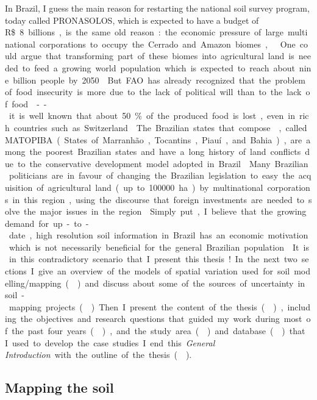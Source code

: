 In Brazil, I guess the main reason for restarting the national soil survey program, today called 
PRONASOLOS, which is expected to have a budget of \SI{8}[R\$]~billions, is the same old reason: the
economic pressure of large multinational corporations to occupy the Cerrado and Amazon biomes, 
 \cite{Macarini2005,Silva2005}. One could argue that transforming part of
these biomes into agricultural land is needed to feed a growing world population which is expected 
to reach about nine billion people by \num{2050} \cite{SanchezEtAl2009}. But FAO has already recognized 
that the problem of food insecurity is more due to the lack of political will than to the
lack of food \cite{FAO2005,FAO2009,FAO2015} -- it is well known that about \SI{50}{\percent} of the
produced food is lost, even in rich countries such as Switzerland \cite{BerettaEtAl2013}. The 
Brazilian states that compose , called MATOPIBA (States of 
Marranhão, Tocantins, Piauí, and Bahia), are among the poorest Brazilian states and have a long 
history of land conflicts due to the conservative development model adopted in Brazil 
\cite{ComissaoPastoraldaTerra2015}. Many Brazilian politicians are in favour of changing the 
Brazilian legislation to easy the acquisition of agricultural land (up to \SI{100000}{\hectare}) by 
multinational corporations in this region, using the discourse that foreign investments are needed 
to solve the major issues in the region \cite{SECOM2015}. Simply put, I believe that the growing 
demand for up-to-date, high resolution soil information in Brazil has an economic motivation which 
is not necessarily beneficial for the general Brazilian population
\cite{ComissaoPastoraldaTerra2015,SECOM2015}. It is in this contradictory scenario that I present this
thesis!

In the next two sections I give an overview of the models of spatial variation used for soil 
modelling/mapping () and discuss about some of the sources of uncertainty in
soil-mapping projects (). Then I present the content of the thesis 
(), including the objectives and research questions that guided my work 
during most of the past four years (), and the study area 
() and database () that I used to develop the case 
studies. I end this \textit{General Introduction} with the outline of the thesis ().

\subsection{Mapping the soil}
\label{sec:intro-soil-mapping}

